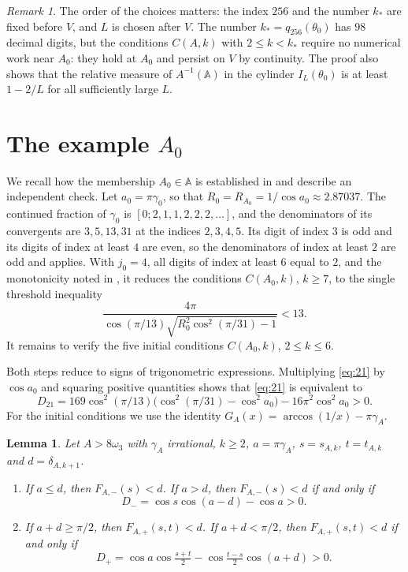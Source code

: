 \documentclass{amsart}
\newtheorem{lemma}[theorem]{Lemma}
\theoremstyle{definition}
\theoremstyle{remark}
\newtheorem{remark}[theorem]{Remark}
\numberwithin{equation}{section}
\newcommand{\AAA}{\mathbb{A}}
\begin{document}
\begin{remark}
The order of the choices matters: the index $256$ and the number $k_*$ are fixed before $V$, and $L$ is chosen after $V$. The number $k_*=q_{256}(\theta_0)$ has $98$ decimal digits, but the conditions $C(A,k)$ with $2\le k<k_*$ require no numerical work near $A_0$: they hold at $A_0$ and persist on $V$ by continuity. The proof also shows that the relative measure of $A^{-1}(\AAA)$ in the cylinder $I_L(\theta_0)$ is at least $1-2/L$ for all sufficiently large $L$.
\end{remark}

\section{The example \texorpdfstring{$A_0$}{A0}}\label{sec:seed}

We recall how the membership $A_0\in\AAA$ is established in \cite[Section~4.2]{HR} and describe an independent check. Let $a_0=\pi\gamma_0$, so that $R_0=R_{A_0}=1/\cos a_0\approx2.87037$. The continued fraction of $\gamma_0$ is $[0;2,1,1,2,2,2,\dots]$, and the denominators of its convergents are $3,5,13,31$ at the indices $2,3,4,5$. Its digit of index $3$ is odd and its digits of index at least $4$ are even, so the denominators of index at least $2$ are odd and \cite[Theorem~14(a)]{HR} applies. With $j_0=4$, all digits of index at least $6$ equal to $2$, and the monotonicity noted in \cite[(21)]{HR}, it reduces the conditions $C(A_0,k)$, $k\ge7$, to the single threshold inequality
\begin{equation}\label{eq:21}
\frac{4\pi}{\cos(\pi/13)\sqrt{R_0^2\cos^2(\pi/31)-1}}<13 .
\end{equation}
It remains to verify the five initial conditions $C(A_0,k)$, $2\le k\le6$.

Both steps reduce to signs of trigonometric expressions. Multiplying \eqref{eq:21} by $\cos a_0$ and squaring positive quantities shows that \eqref{eq:21} is equivalent to
\[
D_{21}=169\cos^2(\pi/13)\bigl(\cos^2(\pi/31)-\cos^2a_0\bigr)-16\pi^2\cos^2a_0>0.
\]
For the initial conditions we use the identity $G_A(x)=\arccos(1/x)-\pi\gamma_A$.

\begin{lemma}\label{lem:cosine}
Let $A>8\omega_3$ with $\gamma_A$ irrational, $k\ge2$, $a=\pi\gamma_A$, $s=s_{A,k}$, $t=t_{A,k}$ and $d=\delta_{A,k+1}$.
\begin{enumerate}
\item If $a\le d$, then $F_{A,-}(s)<d$. If $a>d$, then $F_{A,-}(s)<d$ if and only if
\[
D_-=\cos s\cos(a-d)-\cos a>0 .
\]
\item If $a+d\ge\pi/2$, then $F_{A,+}(s,t)<d$. If $a+d<\pi/2$, then $F_{A,+}(s,t)<d$ if and only if
\[
D_+=\cos a\cos\tfrac{s+t}2-\cos\tfrac{t-s}2\cos(a+d)>0 .
\]
\end{enumerate}
\end{lemma}
\end{document}
